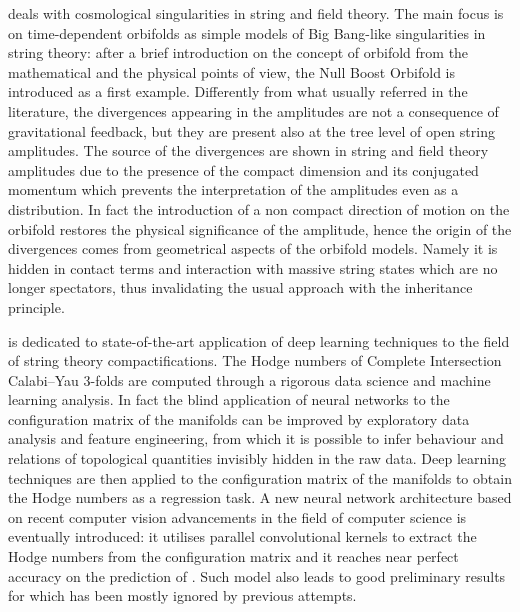  deals with cosmological singularities in string and field theory.
The main focus is on time-dependent orbifolds as simple models of Big Bang-like singularities in string theory: after a brief introduction on the concept of orbifold from the mathematical and the physical points of view, the Null Boost Orbifold is introduced as a first example.
Differently from what usually referred in the literature, the divergences appearing in the amplitudes are not a consequence of gravitational feedback, but they are present also at the tree level of open string amplitudes.
The source of the divergences are shown in string and field theory amplitudes due to the presence of the compact dimension and its conjugated momentum which prevents the interpretation of the amplitudes even as a distribution.
In fact the introduction of a non compact direction of motion on the orbifold restores the physical significance of the amplitude, hence the origin of the divergences comes from geometrical aspects of the orbifold models.
Namely it is hidden in contact terms and interaction with massive string states which are no longer spectators, thus invalidating the usual approach with the inheritance principle.

 is dedicated to state-of-the-art application of deep learning techniques to the field of string theory compactifications.
The Hodge numbers of Complete Intersection Calabi--Yau $3$-folds are computed through a rigorous data science and machine learning analysis.
In fact the blind application of neural networks to the configuration matrix of the manifolds can be improved by exploratory data analysis and feature engineering, from which it is possible to infer behaviour and relations of topological quantities invisibly hidden in the raw data.\footnotemark{}
Deep learning techniques are then applied to the configuration matrix of the manifolds to obtain the Hodge numbers as a regression task.\footnotemark{}
A new neural network architecture based on recent computer vision advancements in the field of computer science is eventually introduced: it utilises parallel convolutional kernels to extract the Hodge numbers from the configuration matrix and it reaches near perfect accuracy on the prediction of .
Such model also leads to good preliminary results for  which has been mostly ignored by previous attempts.
